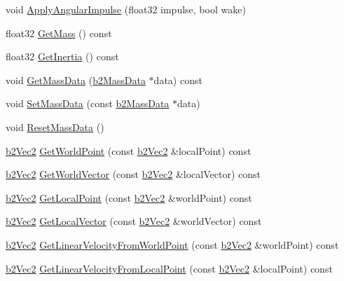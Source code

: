 \begin{DoxyCompactItemize}
void \mbox{\hyperlink{classb2Body_a65384cfad8db2376cdf3fab38cac06e5}{Apply\+Angular\+Impulse}} (float32 impulse, bool wake)
\item 
float32 \mbox{\hyperlink{classb2Body_adfeebf45965d131894f728a2f264311d}{Get\+Mass}} () const
\item 
float32 \mbox{\hyperlink{classb2Body_a60929c13e4b6548492dca5ec79f159db}{Get\+Inertia}} () const
\item 
void \mbox{\hyperlink{classb2Body_a5100927dbd39dd0addea79d5f323f3f1}{Get\+Mass\+Data}} (\mbox{\hyperlink{structb2MassData}{b2\+Mass\+Data}} $\ast$data) const
\item 
void \mbox{\hyperlink{classb2Body_a58a641fedf8a81e1e26d09ec00a22fe2}{Set\+Mass\+Data}} (const \mbox{\hyperlink{structb2MassData}{b2\+Mass\+Data}} $\ast$data)
\item 
void \mbox{\hyperlink{classb2Body_a109d8567c6ae84c61fce2919fb209c63}{Reset\+Mass\+Data}} ()
\item 
\mbox{\hyperlink{structb2Vec2}{b2\+Vec2}} \mbox{\hyperlink{classb2Body_a712b782c61963c6f07beca86acc631ae}{Get\+World\+Point}} (const \mbox{\hyperlink{structb2Vec2}{b2\+Vec2}} \&local\+Point) const
\item 
\mbox{\hyperlink{structb2Vec2}{b2\+Vec2}} \mbox{\hyperlink{classb2Body_ae8c434785b2a730f7c385e708b345bb6}{Get\+World\+Vector}} (const \mbox{\hyperlink{structb2Vec2}{b2\+Vec2}} \&local\+Vector) const
\item 
\mbox{\hyperlink{structb2Vec2}{b2\+Vec2}} \mbox{\hyperlink{classb2Body_a0df8f4312ab23223489323326b2d763d}{Get\+Local\+Point}} (const \mbox{\hyperlink{structb2Vec2}{b2\+Vec2}} \&world\+Point) const
\item 
\mbox{\hyperlink{structb2Vec2}{b2\+Vec2}} \mbox{\hyperlink{classb2Body_aed2f88179cedf4cdbdc47429ebe41288}{Get\+Local\+Vector}} (const \mbox{\hyperlink{structb2Vec2}{b2\+Vec2}} \&world\+Vector) const
\item 
\mbox{\hyperlink{structb2Vec2}{b2\+Vec2}} \mbox{\hyperlink{classb2Body_a5bc9a483e5f59199daa1751786034c1d}{Get\+Linear\+Velocity\+From\+World\+Point}} (const \mbox{\hyperlink{structb2Vec2}{b2\+Vec2}} \&world\+Point) const
\item 
\mbox{\hyperlink{structb2Vec2}{b2\+Vec2}} \mbox{\hyperlink{classb2Body_a0ac0a4ad6ac3c7804652d9994239dcbd}{Get\+Linear\+Velocity\+From\+Local\+Point}} (const \mbox{\hyperlink{structb2Vec2}{b2\+Vec2}} \&local\+Point) const
\item 
\mbox{\label{classb2Body_aff6bc518ea0f07fa5bba7cb7782e86d1}} 

\end{DoxyCompactItemize}
